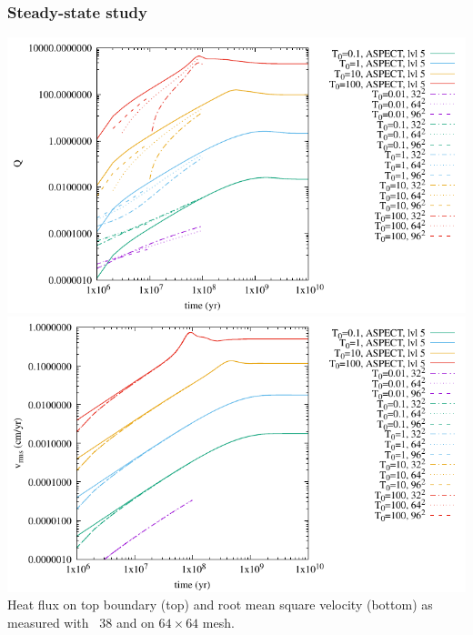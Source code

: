 \subsubsection*{Steady-state study}

\begin{center}
\includegraphics[width=15cm]{python_codes/fieldstone_38/RESULTS/Q.pdf}\\
\includegraphics[width=15cm]{python_codes/fieldstone_38/RESULTS/vrms.pdf}\\
{\captionfont Heat flux on top boundary (top) and root mean square velocity (bottom)
as measured with \stone~38 and \aspect on $64\times 64$ mesh.}
\end{center}


